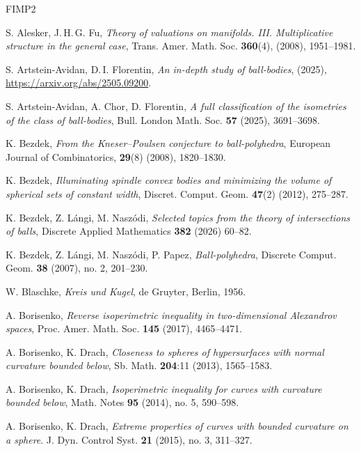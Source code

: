 \documentclass[12pt]{amsart}
\theoremstyle{theorem}
\theoremstyle{Intro}
\theoremstyle{definition}
\theoremstyle{remark}
\theoremstyle{claim}
\numberwithin{equation}{section}
\begin{document}
\begin{thebibliography}{FIMP2}

S. Alesker, J.\,H.\,G. Fu,  \emph{Theory of valuations on manifolds. {III}. {M}ultiplicative structure in the general case}, Trans. Amer. Math. Soc. {\bf360}(4), (2008), 1951--1981.

 S. Artstein-Avidan, D.\,I. Florentin, \emph{An in-depth study of ball-bodies}, (2025), \url{https://arxiv.org/abs/2505.09200}.



S. Artstein-Avidan, A. Chor, D. Florentin, \emph{A full classification of the isometries of the class of ball-bodies}, Bull. London Math. Soc. {\bf 57} (2025), 3691--3698.


 K. Bezdek, \emph{From the Kneser–Poulsen conjecture to ball-polyhedra}, European Journal of Combinatorics, {\bf29}(8) (2008), 1820--1830.

K. Bezdek,  \emph{Illuminating spindle convex bodies and minimizing the volume of spherical sets of constant width}, Discret. Comput. Geom. \textbf{47}(2) (2012), 275--287.


K. Bezdek, Z. L\'angi, M. Nasz\'odi, \emph{Selected topics from the theory of intersections of balls}, Discrete Applied Mathematics \textbf{382} (2026) 60--82.


K. Bezdek, Z. L\'angi, M. Nasz\'odi, P. Papez, \emph{Ball-polyhedra}, Discrete Comput. Geom. \textbf{38} (2007), no. 2, 201--230.

 W. Blaschke,
\emph{Kreis und Kugel}, de Gruyter, Berlin, 1956.

 A. Borisenko, \emph{Reverse isoperimetric inequality in two-dimensional Alexandrov spaces}, Proc. Amer. Math. Soc. \textbf{145} (2017), 4465--4471.

 A. Borisenko, K. Drach, \emph{Closeness to spheres of hypersurfaces with normal curvature bounded below}, Sb. Math. {\bf 204}:11 (2013), 1565--1583.

 A. Borisenko, K. Drach, \emph{Isoperimetric inequality for curves with curvature bounded below}, Math. Notes \textbf{95} (2014), no. 5, 590--598.

 A. Borisenko, K. Drach, \emph{Extreme properties of curves with bounded curvature on a sphere}. J. Dyn. Control Syst. \textbf{21} (2015), no. 3, 311--327.



\end{thebibliography}
\end{document}
